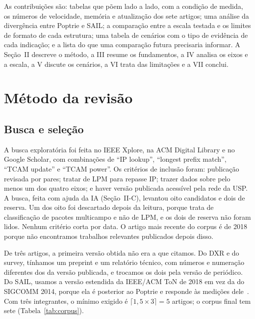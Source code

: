 \documentclass[conference,a4paper]{IEEEtran}
\begin{document}
As contribuições são: tabelas que põem lado a lado, com a condição de medida, os números de velocidade, memória e
atualização dos sete artigos; uma análise da divergência entre Poptrie e SAIL; a comparação entre a escala testada e
os limites de formato de cada estrutura; uma tabela de cenários com o tipo de evidência de cada indicação; e a lista do
que uma comparação futura precisaria informar. A Seção~II descreve o método, a III resume os fundamentos, a IV analisa
os eixos e a escala, a V discute os cenários, a VI trata das limitações e a VII conclui.

\section{Método da revisão}

\subsection{Busca e seleção}
A busca exploratória foi feita no IEEE Xplore, na ACM Digital Library e no Google Scholar, com combinações de
``IP lookup'', ``longest prefix match'', ``TCAM update'' e ``TCAM power''. Os critérios de inclusão foram: publicação
revisada por pares; tratar de LPM para repasse IP; trazer dados sobre pelo menos um dos quatro eixos; e haver versão
publicada acessível pela rede da USP. A busca, feita com ajuda da IA (Seção~II-C), levantou oito candidatos e dois de
reserva. Um dos oito foi descartado depois da leitura, porque trata de classificação de pacotes multicampo e não de
LPM, e os dois de reserva não foram lidos. Nenhum critério corta por data. O artigo mais recente do corpus é de 2018
porque não encontramos trabalhos relevantes publicados depois disso.

De três artigos, a primeira versão obtida não era a que citamos. Do DXR e do survey, tínhamos um preprint e um
relatório técnico, com números e numeração diferentes dos da versão publicada, e trocamos os dois pela versão de
periódico. Do SAIL, usamos a versão estendida da IEEE/ACM ToN de 2018 em vez da do SIGCOMM 2014, porque ela é posterior
ao Poptrie e responde às medições dele~\cite[\S VI-C]{yang18}. Com três integrantes, o mínimo exigido é
$\lceil 1{,}5 \times 3 \rceil = 5$ artigos; o corpus final tem sete (Tabela~\ref{tab:corpus}).
\end{document}
